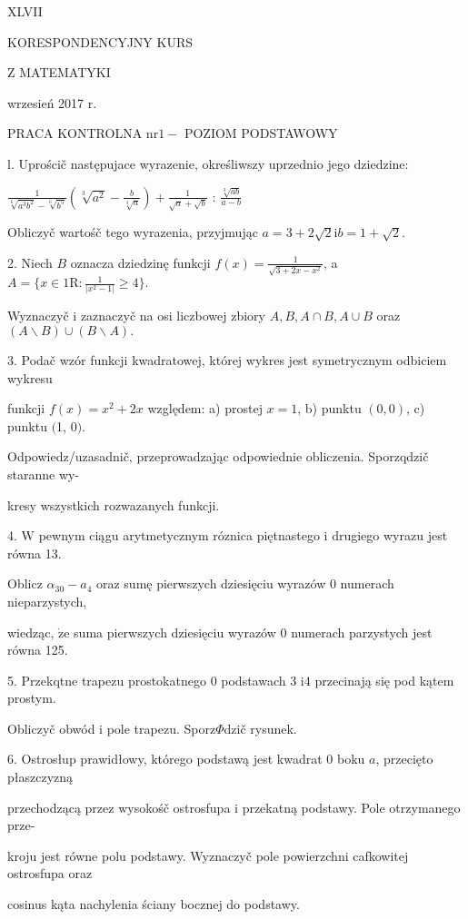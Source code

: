\documentclass[a4paper,12pt]{article}
\begin{document}
XLVII

KORESPONDENCYJNY KURS

Z MATEMATYKI

wrzesień 2017 r.

PRACA KONTROLNA $\mathrm{n}\mathrm{r} 1 -$ POZIOM PODSTAWOWY

l. Uprościč następujace wyrazenie, określiwszy uprzednio jego dziedzine:

$\displaystyle \frac{1}{\sqrt[6]{a^{3}b^{2}}-\sqrt[6]{b^{5}}}(\sqrt[3]{a^{2}}-\frac{b}{\sqrt[3]{a}})+\frac{1}{\sqrt{a}+\sqrt{b}}$ : $\displaystyle \frac{\sqrt[3]{ab}}{a-b}$

Obliczyč wartośč tego wyrazenia, przyjmując $a=3+2\sqrt{2} \mathrm{i} b=1+\sqrt{2}.$

2. Niech $B$ oznacza dziedzinę funkcji $f(x)=\displaystyle \frac{1}{\sqrt{3+2x-x^{2}}}$, a $A=\displaystyle \{x\in 1\mathrm{R}:\frac{1}{|x^{2}-1|}\geq 4\}.$

Wyznaczyč $\mathrm{i}$ zaznaczyč na osi liczbowej zbiory $A, B, A\cap B, A\cup B$ oraz $(A\backslash B)\cup(B\backslash A).$

3. Podač wzór funkcji kwadratowej, której wykres jest symetrycznym odbiciem wykresu

funkcji $f(x)=x^{2}+2x$ względem: a) prostej $x=1$, b) punktu $(0,0)$, c) punktu $($1, $0).$

Odpowiedz/uzasadnič, przeprowadzając odpowiednie obliczenia. Sporzqdzič staranne wy-

kresy wszystkich rozwazanych funkcji.

4. $\mathrm{W}$ pewnym ciągu arytmetycznym róznica piętnastego $\mathrm{i}$ drugiego wyrazu jest równa 13.

Oblicz $\alpha_{30}-a_{4}$ oraz sumę pierwszych dziesięciu wyrazów $0$ numerach nieparzystych,

wiedząc, $\dot{\mathrm{z}}\mathrm{e}$ suma pierwszych dziesięciu wyrazów $0$ numerach parzystych jest równa 125.

5. Przekqtne trapezu prostokatnego $0$ podstawach 3 $\mathrm{i}4$ przecinają się pod kątem prostym.

Obliczyč obwód $\mathrm{i}$ pole trapezu. Sporz$\Phi$dzič rysunek.

6. Ostrosłup prawidłowy, którego podstawą jest kwadrat $0$ boku $a$, przecięto płaszczyzną

przechodzącą przez wysokośč ostrosfupa $\mathrm{i}$ przekatną podstawy. Pole otrzymanego prze-

kroju jest równe polu podstawy. Wyznaczyč pole powierzchni cafkowitej ostrosfupa oraz

cosinus kąta nachylenia ściany bocznej do podstawy.
\end{document}
